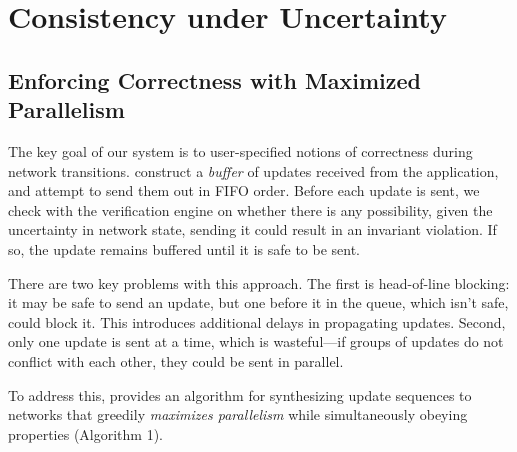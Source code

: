 
\section{Consistency under Uncertainty}


\subsection{Enforcing Correctness with  Maximized Parallelism}
\label{sec:parallelism}

The key goal of our system is to 
user-specified notions of correctness during network transitions.   construct a {\em buffer} of updates received from the application,
and attempt to send them out in FIFO order. Before each update is sent, we check with the
verification engine on whether there is any possibility, given the uncertainty in network state,  sending it could result in an invariant violation. If so, the update remains buffered until it is safe to be sent.

There are two key problems with this approach.
The first is head-of-line blocking: it may be safe to send an update, but one before it in the queue, which isn't safe, could block it. This introduces additional delays in propagating updates.
Second, only one update is sent at a time, which is wasteful---if groups of updates do not conflict with each other, they could be sent in parallel.

To address this,
\name provides an algorithm for synthesizing update sequences to networks that greedily {\em maximizes parallelism} while
simultaneously obeying  properties
(Algorithm 1).%

